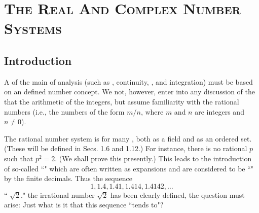 \chapter{\textsc{The Real And Complex Number Systems}}
\section*{Introduction}
A  of the main  of analysis (such as , continuity, , and integration) must be based on an  defined number concept. We  not, however, enter into any discussion of the  that  the arithmetic of the integers, but assume familiarity with the rational numbers (i.e., the numbers of the form $m / n$, where $m$ and $n$ are integers and $n \neq 0$).

The rational number system is  for many , both as a field and as an ordered set. (These  will be defined in Secs. 1.6 and 1.12.) For instance, there is no rational $p$ such that $p^2=2$. (We shall prove this presently.) This leads to the introduction of so-called ``" which are often written as  expansions and are considered to be ``" by the  finite decimals. Thus the sequence
\[
  1,1.4,1.41,1.414,1.4142, \ldots
\]
`` $\sqrt{2}$."  the irrational number $\sqrt{2}$ has been clearly defined, the question must arise: Just what is it that this sequence ``tends to"?

